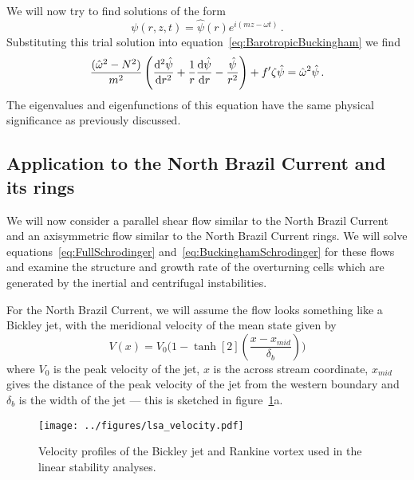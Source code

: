We will now try to find solutions of the form
\begin{equation}
    \psi(r, z, t) = \hat{\psi}(r) e^{i(mz - \omega t)} \, .
\end{equation}
Substituting this trial solution into equation~\ref{eq:BarotropicBuckingham} we find
\begin{equation}
    \frac{(\hat{\omega}^2 - N^2 )}{m^2}\, \Bigg(\dv[2]{\hat{\psi}}{r} + \frac{1}{r} \dv{\hat{\psi}}{r} - \frac{\hat{\psi}}{r^2}\Bigg) + f' \zeta \hat{\psi} = \hat{\omega}^2 \hat{\psi}\, .
    \label{eq:BuckinghamSchrodinger}
\end{equation}
The eigenvalues and eigenfunctions of this equation have the same physical significance as previously discussed.

\subsection{Application to the North Brazil Current and its rings}
\label{subsec:NBClsa}
We will now consider a parallel shear flow similar to the North Brazil Current and an axisymmetric flow similar to the North Brazil Current rings. We will solve equations~\ref{eq:FullSchrodinger} and~\ref{eq:BuckinghamSchrodinger} for these flows and examine the structure and growth rate of the overturning cells which are generated by the inertial and centrifugal instabilities.

For the North Brazil Current, we will assume the flow looks something like a Bickley jet, with the meridional velocity of the mean state given by
\begin{equation}
    V(x) = V_0 \Bigg( 1 - \tanh[2](\frac{x - x_{mid}}{\delta_b})\Bigg)
\end{equation}
where $V_0$ is the peak velocity of the jet, $x$ is the across stream coordinate, $x_{mid}$ gives the distance of the peak velocity of the jet from the western boundary and $\delta_b$ is the width of the jet --- this is sketched in figure~\ref{fig:InitialVelocity}a.

\begin{figure}[t]
    \centering
    \texttt{[image: ../figures/lsa\_velocity.pdf]}
    \caption{Velocity profiles of the Bickley jet and Rankine vortex used in the linear stability analyses.}
    \label{fig:InitialVelocity}
\end{figure}

